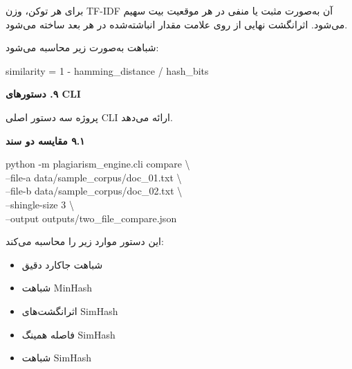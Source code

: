 \documentclass[11pt]{article}
\begin{document}
\noindent ‏برای هر توکن، وزن TF-IDF آن به‌صورت مثبت یا منفی در هر موقعیت بیت سهیم می‌شود. اثرانگشت نهایی از روی علامت مقدار انباشته‌شده در هر بعد ساخته می‌شود.\par

\noindent ‏شباهت به‌صورت زیر محاسبه می‌شود:\par

{\mycode
\begin{flushleft}
similarity = 1 - hamming\_distance / hash\_bits
\end{flushleft}}

\medskip\noindent\hrulefill\medskip

\medskip
{\large\bfseries ‏۹. دستورهای CLI}\medskip


\noindent ‏پروژه سه دستور اصلی CLI ارائه می‌دهد.\par

\smallskip
{\bfseries ‏۹.۱ مقایسه دو سند}\smallskip


{\mycode
\begin{flushleft}
python -m plagiarism\_engine.cli compare \textbackslash{} \\
\hspace*{1.10em}--file-a data/sample\_corpus/doc\_01.txt \textbackslash{} \\
\hspace*{1.10em}--file-b data/sample\_corpus/doc\_02.txt \textbackslash{} \\
\hspace*{1.10em}--shingle-size 3 \textbackslash{} \\
\hspace*{1.10em}--output outputs/two\_file\_compare.json
\end{flushleft}}

\noindent ‏این دستور موارد زیر را محاسبه می‌کند:\par

\begin{itemize}

\item ‏شباهت جاکارد دقیق

\item ‏شباهت MinHash

\item ‏اثرانگشت‌های SimHash

\item ‏فاصله همینگ SimHash

\item ‏شباهت SimHash

\end{itemize}
\end{document}
